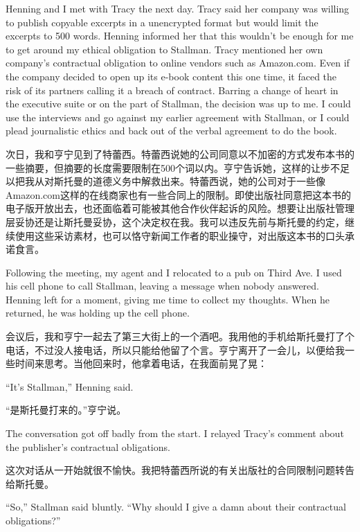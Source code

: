 \ifdefined\eng
Henning and I met with Tracy the next day. Tracy said her company was willing to publish copyable excerpts in a unencrypted format but would limit the excerpts to 500 words. Henning informed her that this wouldn't be enough for me to get around my ethical obligation to Stallman. Tracy mentioned her own company's contractual obligation to online vendors such as Amazon.com. Even if the company decided to open up its e-book content this one time, it faced the risk of its partners calling it a breach of contract. Barring a change of heart in the executive suite or on the part of Stallman, the decision was up to me. I could use the interviews and go against my earlier agreement with Stallman, or I could plead journalistic ethics and back out of the verbal agreement to do the book.
\fi

\ifdefined\chs
次日，我和亨宁见到了特蕾西。特蕾西说她的公司同意以不加密的方式发布本书的一些摘要，但摘要的长度需要限制在500个词以内。亨宁告诉她，这样的让步不足以把我从对斯托曼的道德义务中解救出来。特蕾西说，她的公司对于一些像Amazon.com这样的在线商家也有一些合同上的限制。即使出版社同意把这本书的电子版开放出去，也还面临着可能被其他合作伙伴起诉的风险。想要让出版社管理层妥协还是让斯托曼妥协，这个决定权在我。我可以违反先前与斯托曼的约定，继续使用这些采访素材，也可以恪守新闻工作者的职业操守，对出版这本书的口头承诺食言。
\fi

\ifdefined\eng
Following the meeting, my agent and I relocated to a pub on Third Ave. I used his cell phone to call Stallman, leaving a message when nobody answered. Henning left for a moment, giving me time to collect my thoughts. When he returned, he was holding up the cell phone.
\fi

\ifdefined\chs
会议后，我和亨宁一起去了第三大街上的一个酒吧。我用他的手机给斯托曼打了个电话，不过没人接电话，所以只能给他留了个言。亨宁离开了一会儿，以便给我一些时间来思考。当他回来时，他拿着电话，在我面前晃了晃：
\fi

\ifdefined\eng
``It's Stallman,'' Henning said.
\fi

\ifdefined\chs
``是斯托曼打来的。''亨宁说。
\fi

\ifdefined\eng
The conversation got off badly from the start. I relayed Tracy's comment about the publisher's contractual obligations.
\fi

\ifdefined\chs
这次对话从一开始就很不愉快。我把特蕾西所说的有关出版社的合同限制问题转告给斯托曼。
\fi

\ifdefined\eng
``So,'' Stallman said bluntly. ``Why should I give a damn about their contractual obligations?''
\fi

